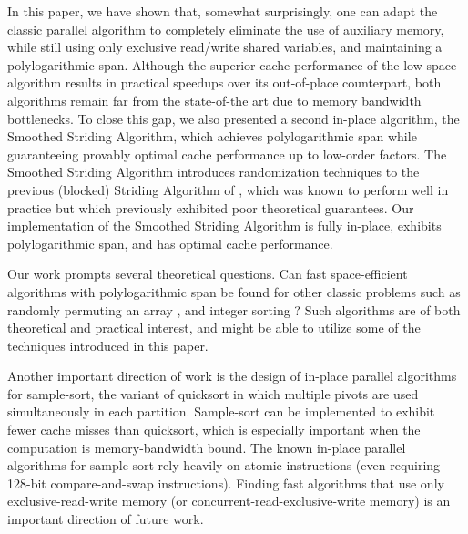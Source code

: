 \documentclass[11pt]{article}
\theoremstyle{remark}
\theoremstyle{remark}
\begin{document}
In this paper, we have shown that, somewhat surprisingly, one can
adapt the classic parallel algorithm to completely eliminate the
use of auxiliary memory, while still using only exclusive
read/write shared variables, and maintaining a polylogarithmic
span. Although the superior cache performance of the low-space
algorithm results in practical speedups over its out-of-place
counterpart, both algorithms remain far from the state-of-the art
due to memory bandwidth bottlenecks. To close this gap, we also
presented a second in-place algorithm, the Smoothed Striding
Algorithm, which achieves polylogarithmic span while guaranteeing
provably optimal cache performance up to low-order factors. The
Smoothed Striding Algorithm introduces randomization techniques
to the previous (blocked) Striding Algorithm of \cite{Frias08,
FrancisPa92}, which was known to perform well in practice but
which previously exhibited poor theoretical guarantees. Our
implementation of the Smoothed Striding Algorithm is fully
in-place, exhibits polylogarithmic span, and has optimal cache
performance.

Our work prompts several theoretical questions. Can fast
space-efficient algorithms with polylogarithmic span be found for
other classic problems such as randomly permuting an array
\cite{Anderson90, AlonsoSc96, ShunGu15}, and integer sorting
\cite{Rajasekaran92, HanHe12, AlbersHa97, Han01, GerbessiotisSi04}?
Such algorithms are of both theoretical and practical interest, and
might be able to utilize some of the techniques introduced in this
paper.

Another important direction of work is the design of in-place parallel
algorithms for sample-sort, the variant of quicksort in which multiple
pivots are used simultaneously in each partition. Sample-sort can be
implemented to exhibit fewer cache misses than quicksort, which is
especially important when the computation is memory-bandwidth
bound. The known in-place parallel algorithms for sample-sort rely
heavily on atomic instructions \cite{AxtmannWi17} (even requiring
128-bit compare-and-swap instructions). Finding fast algorithms that
use only exclusive-read-write memory (or
concurrent-read-exclusive-write memory) is an important direction of
future work.

\clearpage

\appendix

\end{document}

